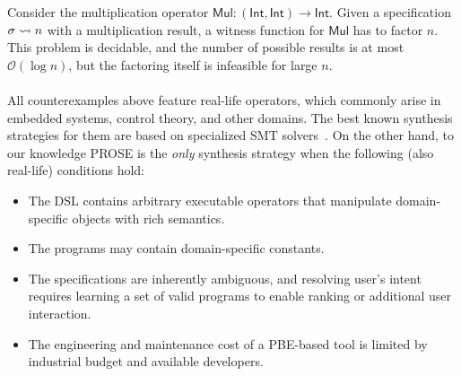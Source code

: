 Consider the multiplication operator $\mathsf{Mul}\colon (\mathsf{Int}, \mathsf{Int}) \to \mathsf{Int}$.
Given a specification $\sigma \rightsquigarrow n$ with a multiplication result, a witness function for $\mathsf{Mul}$
has to factor $n$.
This problem is decidable, and the number of possible results is at most $\mathcal{O}(\log n)$, but the factoring itself
is infeasible for large $n$.

\paragraph{}
\indent All counterexamples above feature real-life operators, which commonly arise in embedded systems, control theory,
and other domains.
The best known synthesis strategies for them are based on specialized SMT solvers~\cite{sygus}.
On the other hand, to our knowledge PROSE is the \emph{only} synthesis strategy when the following (also real-life)
conditions hold:
\begin{itemize}[nosep]
    \item The DSL contains arbitrary executable operators that manipulate domain-specific objects with rich semantics.
    \item The programs may contain domain-specific constants.
    \item The specifications are inherently ambiguous, and resolving user's intent requires learning a set of valid
        programs to enable ranking or additional user interaction.
    \item The engineering and maintenance cost of a PBE\hyp{}based tool is limited by industrial budget and available
        developers.
\end{itemize}

